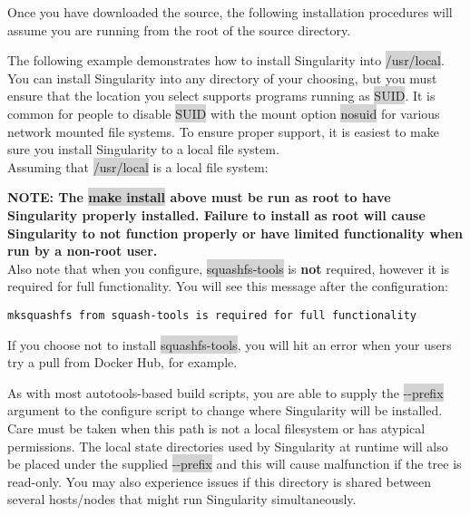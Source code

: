 \documentclass[a4paper]{article}
\newcounter{subsubsubsection}[subsubsection]
\begin{document}
Once you have downloaded the source, the following installation procedures will assume you are running from the root of the source directory.
\\[0.1in]


The following example demonstrates how to install Singularity into \colorbox{lightgray}{/usr/local}. You can install Singularity into any directory of your choosing, but you must ensure that the location you select supports programs running as \colorbox{lightgray}{SUID}. It is common for people to disable \colorbox{lightgray}{SUID} with the mount option \colorbox{lightgray}{nosuid} for various network mounted file systems. To ensure proper support, it is easiest to make sure you install Singularity to a local file system.\\[0.1in]

Assuming that \colorbox{lightgray}{/usr/local} is a local file system:


\textbf{NOTE: The \colorbox{lightgray}{make install} above must be run as root to have Singularity properly installed. Failure to install as root will cause Singularity to not function properly or have limited functionality when run by a non-root user.}\\[0.1in]

Also note that when you configure, \colorbox{lightgray}{squashfs-tools} is \textbf{not} required, however it is required for full functionality. You will see this message after the configuration:\\[0.1in]

\begin{lstlisting}[frame=single]
mksquashfs from squash-tools is required for full functionality
\end{lstlisting}

If you choose not to install \colorbox{lightgray}{squashfs-tools}, you will hit an error when your users try a pull from Docker Hub, for example.


As with most autotools-based build scripts, you are able to supply the \colorbox{lightgray}{-{}-prefix} argument to the configure script to change where Singularity will be installed. Care must be taken when this path is not a local filesystem or has atypical permissions. The local state directories used by Singularity at runtime will also be placed under the supplied \colorbox{lightgray}{-{}-prefix} and this will cause malfunction if the tree is read-only. You may also experience issues if this directory is shared between several hosts/nodes that might run Singularity simultaneously.\\[0.1in]
\end{document}

